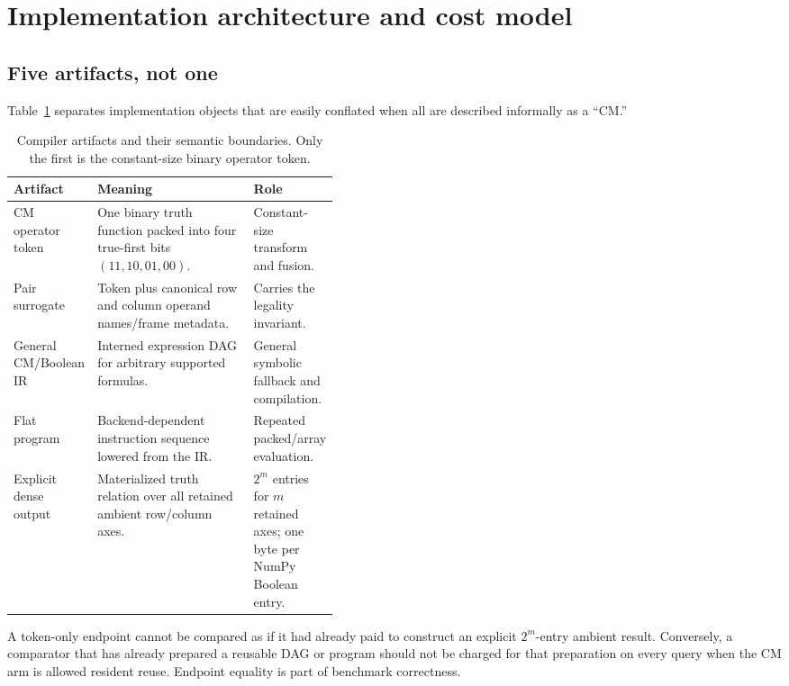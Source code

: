 \documentclass[10pt]{article}
\theoremstyle{plain}
\theoremstyle{definition}
\theoremstyle{remark}
\begin{document}
\section{Implementation architecture and cost model}
\label{sec:implementation}

\subsection{Five artifacts, not one}

Table~\ref{tab:artifacts} separates implementation objects that are easily conflated when all are described informally as a ``CM.''

\begin{table}[t]
\centering
\small
\begin{tabularx}{\linewidth}{@{}>{\raggedright\arraybackslash}p{0.18\linewidth}>{\raggedright\arraybackslash}X >{\raggedright\arraybackslash}p{0.24\linewidth}@{}}
\toprule
\textbf{Artifact} & \textbf{Meaning} & \textbf{Role}\\
\midrule
CM operator token & One binary truth function packed into four true-first bits $(11,10,01,00)$. & Constant-size transform and fusion.\\
Pair surrogate & Token plus canonical row and column operand names/frame metadata. & Carries the legality invariant.\\
General CM/Boolean IR & Interned expression DAG for arbitrary supported formulas. & General symbolic fallback and compilation.\\
Flat program & Backend-dependent instruction sequence lowered from the IR. & Repeated packed/array evaluation.\\
Explicit dense output & Materialized truth relation over all retained ambient row/column axes. & $2^m$ entries for $m$ retained axes; one byte per NumPy Boolean entry.\\
\bottomrule
\end{tabularx}
\caption{Compiler artifacts and their semantic boundaries. Only the first is the constant-size binary operator token.}
\label{tab:artifacts}
\end{table}

A token-only endpoint cannot be compared as if it had already paid to construct an explicit $2^m$-entry ambient result. Conversely, a comparator that has already prepared a reusable DAG or program should not be charged for that preparation on every query when the CM arm is allowed resident reuse. Endpoint equality is part of benchmark correctness.
\end{document}
